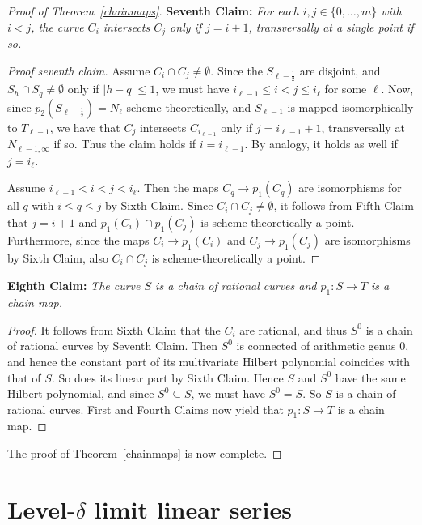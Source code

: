 \documentclass[a4paper,11pt]{amsart}
\theoremstyle{plain}
\theoremstyle{definition}
\theoremstyle{remark}
\def\:{\colon}
\begin{document}
\begin{proof}[Proof of Theorem~\ref{chainmaps}]
{\bf Seventh Claim:} {\it For each $i,j\in\{0,\dots,m\}$ with $i<j$, the curve $C_i$ intersects $C_j$ only if $j=i+1$, transversally at a single point if so.}

\begin{proof}[Proof seventh claim] Assume $C_i\cap C_j\neq\emptyset$. 
Since the $S_{\ell-\frac{1}{2}}$ are disjoint, and $S_h\cap S_q\neq\emptyset$ only if $|h-q|\leq 1$, we must have 
$i_{\ell-1}\leq i<j\leq i_{\ell}$ for some $\ell$. Now, since $p_2(S_{\ell-\frac{1}{2}})=N_\ell$ scheme-theoretically, and 
$S_{\ell-1}$ is mapped isomorphically to 
$T_{\ell-1}$, 
we have that $C_j$ intersects $C_{i_{\ell-1}}$ only if $j=i_{\ell-1}+1$, transversally at $N_{\ell-1,\infty}$ if so. Thus 
the claim holds if $i=i_{\ell-1}$. By analogy, it holds as well if $j=i_\ell$.

Assume $i_{\ell-1}<i<j<i_\ell$. Then the maps $C_q\to p_1(C_q)$ are isomorphisms for all $q$ with $i\leq q\leq j$ by Sixth Claim.
Since $C_i\cap C_j\neq\emptyset$, it follows from Fifth Claim that $j=i+1$ and $p_1(C_i)\cap p_1(C_j)$ is scheme-theoretically a point. Furthermore, since the maps $C_i\to p_1(C_i)$ and $C_j\to p_1(C_j)$ are isomorphisms by Sixth Claim, also $C_i\cap C_j$ is scheme-theoretically a point.
\end{proof}

{\bf Eighth Claim:} {\it The curve $S$ is a chain of rational curves and $p_1\:S\to T$ is a chain map.}

\begin{proof} It follows from Sixth Claim that the $C_i$ are rational, and thus $S^0$ is a chain of rational curves by Seventh Claim. Then $S^0$ is connected of arithmetic genus $0$, and hence the constant part of its multivariate Hilbert polynomial coincides with that of $S$. So does its linear part by Sixth Claim. Hence $S$ and $S^0$ have the same Hilbert polynomial, and since $S^0\subseteq S$, we must have $S^0=S$. So $S$ is a chain of rational curves. First and Fourth Claims now yield that $p_1\colon S\to T$ is a chain map.
\end{proof}

The proof of Theorem~\ref{chainmaps} is now complete.
\end{proof}


\section{Level-$\delta$ limit linear series}\label{deltalls}
\end{document}
